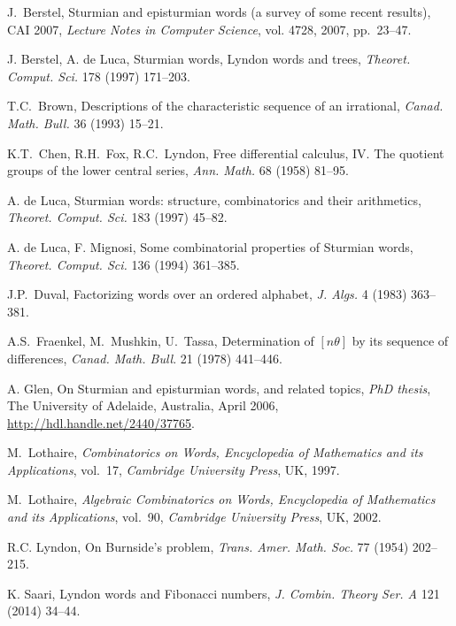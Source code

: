 \documentclass[11pt]{amsart}
\newcommand{\1}{\bar{1}}
\theoremstyle{plain}
\theoremstyle{definition}
\theoremstyle{remark}
\begin{document}
\begin{thebibliography}{99}

 J.~Berstel, Sturmian and episturmian words (a survey of
some recent results), CAI 2007, \textit{Lecture Notes in Computer Science},
vol. 4728, 2007, pp.~23--47.

 J. Berstel, A. de Luca, Sturmian words, Lyndon words and trees, \textit{Theoret. Comput. Sci.} 178 (1997) 171--203.

 T.C.~Brown, Descriptions of the characteristic sequence of an irrational,
\textit{Canad. Math. Bull.} 36 (1993) 15--21.


 K.T.~Chen, R.H.~Fox, R.C.~Lyndon,
Free differential calculus, IV.  The quotient groups of the lower central series,
\textit{Ann. Math.} 68 (1958) 81--95.

 A. de Luca, Sturmian words: structure, combinatorics and their arithmetics, \textit{Theoret. Comput. Sci.} 183 (1997) 45--82.

 A. de Luca, F. Mignosi, Some combinatorial properties of Sturmian words, \textit{Theoret. Comput. Sci.} 136 (1994) 361--385.


 J.P.~Duval, Factorizing words over an ordered alphabet,
\textit{J. Algs.} 4 (1983) 363--381.

 A.S.~Fraenkel, M.~Mushkin, U.~Tassa, Determination of $[n\theta]$
by its sequence of differences, \textit{Canad. Math. Bull}. {21} (1978) 441--446.

 A. Glen, On Sturmian and episturmian words, and related topics, \textit{PhD thesis}, The University of Adelaide, Australia, April 2006, \url{http://hdl.handle.net/2440/37765}.

 M.~Lothaire, \textit{Combinatorics on Words, Encyclopedia of Mathematics and its Applications}, vol.~17, \textit{Cambridge University Press}, UK, 1997.

 M.~Lothaire, \textit{Algebraic Combinatorics on Words, Encyclopedia of Mathematics and its Applications}, vol.~90, \textit{Cambridge University Press}, UK, 2002.

 R.C. Lyndon, On Burnside's problem, \textit{ Trans. Amer. Math. Soc.} 77 (1954) 202--215.


 K. Saari, Lyndon words and Fibonacci numbers, \textit{J. Combin. Theory Ser. A} 121 (2014) 34--44.



\end{thebibliography}


 
\end{document}
